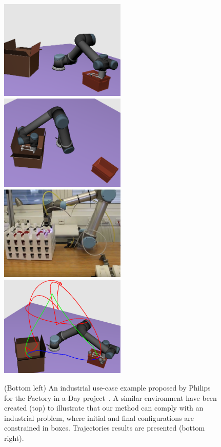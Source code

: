 \documentclass{tADR2e}
\begin{document}
\begin{figure}[t]
	\centering
	\includegraphics[width=6cm]{fiad_qinit.png}
	\includegraphics[width=6cm]{fiad_qfinal.png}\\
	\includegraphics[width=6cm]{fiad_real.png}
	\includegraphics[width=6cm]{fiad-trajectorires.png}
	
	\caption{(Bottom left) An industrial use-case example proposed by Philips for 	
	the 
	Factory-in-a-Day project~\cite{factory-day-video}. A similar environment have 
	been created (top) to 
	illustrate that our method can comply with an industrial problem, where 
	initial and final configurations are constrained in boxes. Trajectories results 
	are presented (bottom right).}
	\label{fiad}
\end{figure}
\end{document}
